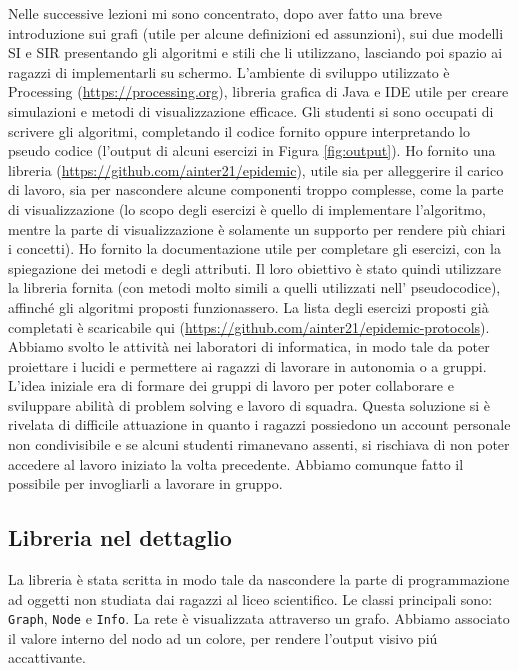 Nelle successive lezioni mi sono concentrato, dopo aver fatto una breve introduzione sui grafi (utile per alcune definizioni ed assunzioni), sui due modelli SI e SIR presentando gli algoritmi e stili che li utilizzano, lasciando poi spazio ai ragazzi di implementarli su schermo. L’ambiente di sviluppo utilizzato è Processing (\href{https://processing.org}{https://processing.org}), libreria grafica di Java e IDE utile per creare simulazioni e metodi di visualizzazione efficace. Gli studenti si sono occupati di scrivere gli algoritmi, completando il codice fornito oppure interpretando lo pseudo codice (l'output di alcuni esercizi in Figura \ref{fig:output}). Ho fornito una libreria (\href{https://github.com/ainter21/epidemic}{https://github.com/ainter21/epidemic}), utile sia per alleggerire il carico di lavoro, sia per nascondere alcune componenti troppo complesse, come la parte di visualizzazione (lo scopo degli esercizi è quello di implementare l’algoritmo, mentre la parte di visualizzazione è solamente un supporto per rendere più chiari i concetti).
Ho fornito la documentazione utile per completare gli esercizi, con la spiegazione dei metodi e degli attributi. Il loro obiettivo è stato quindi utilizzare la libreria fornita (con metodi molto simili a quelli utilizzati nell' pseudocodice), affinché gli algoritmi proposti funzionassero. La lista degli esercizi proposti già completati è scaricabile qui (\href{https://github.com/ainter21/epidemic-protocols}{https://github.com/ainter21/epidemic-protocols}).
Abbiamo svolto le attività nei laboratori di informatica, in modo tale da poter proiettare i lucidi e permettere ai ragazzi di lavorare in autonomia o a gruppi. L'idea iniziale era di formare dei gruppi di lavoro per poter collaborare e sviluppare abilità di problem solving e lavoro di squadra. Questa soluzione si è rivelata di difficile attuazione in quanto i ragazzi possiedono un account personale non condivisibile e se alcuni studenti rimanevano assenti, si rischiava di non poter accedere al lavoro iniziato la volta precedente. Abbiamo comunque fatto il possibile per invogliarli a lavorare in gruppo.

\subsection{Libreria nel dettaglio}
La libreria è stata scritta in modo tale da nascondere la parte di programmazione ad oggetti non studiata dai ragazzi al liceo scientifico. Le classi principali sono: \texttt{Graph}, \texttt{Node} e \texttt{Info}. La rete è visualizzata attraverso un grafo. Abbiamo associato il valore interno del nodo ad un colore, per rendere l'output visivo piú accattivante.

